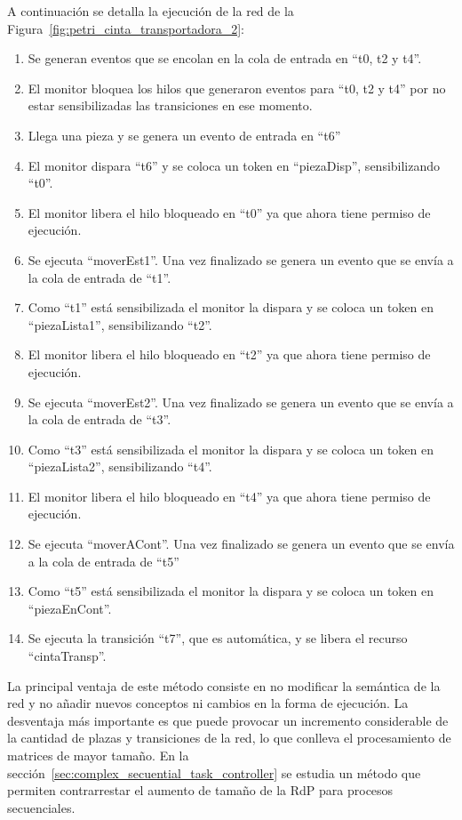 A continuación se detalla la ejecución de la red de la
Figura~\ref{fig:petri_cinta_transportadora_2}:\\
\begin{enumerate}
	\item Se generan eventos que se encolan en la cola de entrada en “t0, t2 y
		t4”.
	\item El monitor bloquea los hilos que generaron eventos para “t0, t2 y t4” por
		no estar sensibilizadas las transiciones en ese momento.
	\item Llega una pieza y se genera un evento de entrada en “t6”
	\item El monitor dispara “t6” y se coloca un token en “piezaDisp”,
		sensibilizando “t0”.
	\item El monitor libera el hilo bloqueado en “t0” ya que ahora tiene permiso
		de ejecución.
	\item Se ejecuta “moverEst1”. Una vez finalizado se genera un evento que se
		envía a la cola de entrada de “t1”.
	\item Como “t1” está sensibilizada el monitor la dispara y se coloca un token
		en “piezaLista1”, sensibilizando “t2”.
	\item El monitor libera el hilo bloqueado en “t2” ya que ahora tiene permiso
		de ejecución.
	\item Se ejecuta “moverEst2”. Una vez finalizado se genera un evento que se
		envía a la cola de entrada de “t3”.
	\item Como “t3” está sensibilizada el monitor la dispara y se coloca un token
		en “piezaLista2”, sensibilizando “t4”.
	\item El monitor libera el hilo bloqueado en “t4” ya que ahora tiene permiso
		de ejecución.
	\item Se ejecuta “moverACont”. Una vez finalizado se genera un evento que se
		envía a la cola de entrada de “t5”
	\item Como “t5” está sensibilizada el monitor la dispara y se coloca un token
		en ``piezaEnCont''.
	\item Se ejecuta la transición ``t7'', que es automática, y se libera el
		recurso ``cintaTransp''.
\end{enumerate}

La principal ventaja de este método consiste en no modificar la semántica de
la red y no añadir nuevos conceptos ni cambios en la forma de ejecución.
La desventaja más importante es que puede provocar un incremento considerable de
la cantidad de plazas y transiciones de la red, lo que conlleva el
procesamiento de matrices de mayor tamaño. En la
sección~\ref{sec:complex_secuential_task_controller} se estudia un método que
permiten contrarrestar el aumento de tamaño de la RdP para procesos
secuenciales.

